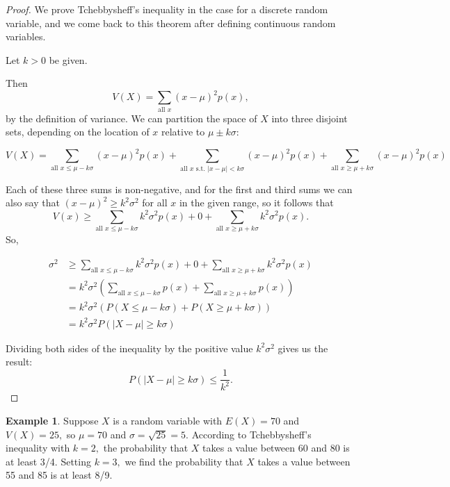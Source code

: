 \documentclass[
]{book}
\theoremstyle{definition}
\theoremstyle{definition}
\newtheorem{example}{Example}[chapter]
\theoremstyle{definition}
\theoremstyle{definition}
\theoremstyle{remark}
\begin{document}
\begin{proof}
We prove Tchebbysheff's inequality in the case for a discrete random variable, and we come back to this theorem after defining continuous random variables.

Let \(k > 0\) be given.

Then \[V(X) = \sum_{\text{all }x} (x - \mu)^2 p(x),\] by the definition of variance. We can partition the space of \(X\) into three disjoint sets, depending on the location of \(x\) relative to \(\mu \pm k\sigma\):

\[V(X) = \sum_{\text{all } x \leq \mu - k\sigma} (x - \mu)^2 p(x) + 
\sum_{\text{all } x \text{ s.t. } |x-\mu|< k\sigma } (x - \mu)^2 p(x) + \sum_{\text{all } x \geq \mu + k\sigma} (x - \mu)^2 p(x)\]

Each of these three sums is non-negative, and for the first and third sums we can also say that \((x-\mu)^2 \geq k^2\sigma^2\) for all \(x\) in the given range, so it follows that \[V(x) \geq \sum_{\text{all } x \leq \mu - k\sigma} k^2\sigma^2 p(x) + 0 + \sum_{\text{all } x \geq \mu + k\sigma} k^2\sigma^2 p(x).\]
So,

\begin{align*}
\sigma^2 &\geq \sum_{\text{all } x \leq \mu - k\sigma} k^2\sigma^2 p(x) + 0 + \sum_{\text{all } x \geq \mu + k\sigma} k^2\sigma^2 p(x)  \\
  &= k^2\sigma^2 \left(\sum_{\text{all } x \leq \mu - k\sigma} p(x) + \sum_{\text{all } x \geq \mu + k\sigma} p(x) \right) \\
  &= k^2\sigma^2\left(P(X\leq \mu-k\sigma)+P(X \geq \mu+k\sigma)\right) \\
  &= k^2\sigma^2P(|X-\mu|\geq k\sigma)
\end{align*}

Dividing both sides of the inequality by the positive value \(k^2\sigma^2\) gives us the result:
\[P(|X-\mu| \geq k\sigma) \leq \frac{1}{k^2}.\]
\end{proof}

\begin{example}
\protect\hypertarget{exm:tchebby}{}\label{exm:tchebby}Suppose \(X\) is a random variable with \(E(X) = 70\) and \(V(X) = 25,\) so \(\mu = 70\) and \(\sigma = \sqrt{25} = 5\).
According to Tchebbysheff's inequality with \(k = 2,\) the probability that \(X\) takes a value between 60 and 80 is at least 3/4. Setting \(k = 3,\) we find the probability that \(X\) takes a value between 55 and 85 is at least 8/9.
\end{example}
\end{document}

